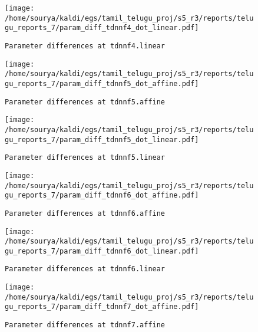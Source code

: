 \documentclass[prl,10pt,twocolumn]{revtex4}
\begin{document}
\newpage
\begin{figure}[h]
  \begin{center}
    \caption{\texttt{Parameter differences at tdnnf4.linear}}
    \texttt{[image: /home/sourya/kaldi/egs/tamil\_telugu\_proj/s5\_r3/reports/telugu\_reports\_7/param\_diff\_tdnnf4\_dot\_linear.pdf]}
  \end{center}
\end{figure}
\clearpage


\newpage
\begin{figure}[h]
  \begin{center}
    \caption{\texttt{Parameter differences at tdnnf5.affine}}
    \texttt{[image: /home/sourya/kaldi/egs/tamil\_telugu\_proj/s5\_r3/reports/telugu\_reports\_7/param\_diff\_tdnnf5\_dot\_affine.pdf]}
  \end{center}
\end{figure}
\clearpage


\newpage
\begin{figure}[h]
  \begin{center}
    \caption{\texttt{Parameter differences at tdnnf5.linear}}
    \texttt{[image: /home/sourya/kaldi/egs/tamil\_telugu\_proj/s5\_r3/reports/telugu\_reports\_7/param\_diff\_tdnnf5\_dot\_linear.pdf]}
  \end{center}
\end{figure}
\clearpage


\newpage
\begin{figure}[h]
  \begin{center}
    \caption{\texttt{Parameter differences at tdnnf6.affine}}
    \texttt{[image: /home/sourya/kaldi/egs/tamil\_telugu\_proj/s5\_r3/reports/telugu\_reports\_7/param\_diff\_tdnnf6\_dot\_affine.pdf]}
  \end{center}
\end{figure}
\clearpage


\newpage
\begin{figure}[h]
  \begin{center}
    \caption{\texttt{Parameter differences at tdnnf6.linear}}
    \texttt{[image: /home/sourya/kaldi/egs/tamil\_telugu\_proj/s5\_r3/reports/telugu\_reports\_7/param\_diff\_tdnnf6\_dot\_linear.pdf]}
  \end{center}
\end{figure}
\clearpage


\newpage
\begin{figure}[h]
  \begin{center}
    \caption{\texttt{Parameter differences at tdnnf7.affine}}
    \texttt{[image: /home/sourya/kaldi/egs/tamil\_telugu\_proj/s5\_r3/reports/telugu\_reports\_7/param\_diff\_tdnnf7\_dot\_affine.pdf]}
  \end{center}
\end{figure}
\clearpage
\end{document}
